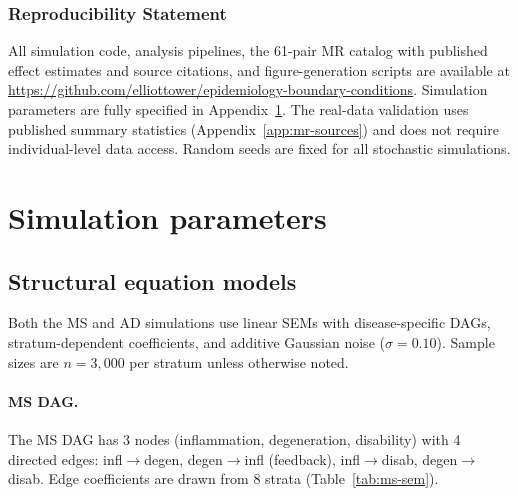\documentclass[11pt]{article}
\begin{document}
\subsubsection*{Reproducibility Statement}
All simulation code, analysis pipelines, the 61-pair MR catalog with published effect estimates and source citations, and figure-generation scripts are available at \url{https://github.com/elliottower/epidemiology-boundary-conditions}. Simulation parameters are fully specified in Appendix~\ref{app:sim-params}. The real-data validation uses published summary statistics (Appendix~\ref{app:mr-sources}) and does not require individual-level data access. Random seeds are fixed for all stochastic simulations.




\appendix

\section{Simulation parameters}
\label{app:sim-params}

\subsection{Structural equation models}

Both the MS and AD simulations use linear SEMs with disease-specific DAGs, stratum-dependent coefficients, and additive Gaussian noise ($\sigma = 0.10$). Sample sizes are $n = 3{,}000$ per stratum unless otherwise noted.

\paragraph{MS DAG.}
The MS DAG has 3 nodes (inflammation, degeneration, disability) with 4 directed edges: infl$\to$degen, degen$\to$infl (feedback), infl$\to$disab, degen$\to$disab. Edge coefficients are drawn from 8 strata (Table~\ref{tab:ms-sem}).
\end{document}
